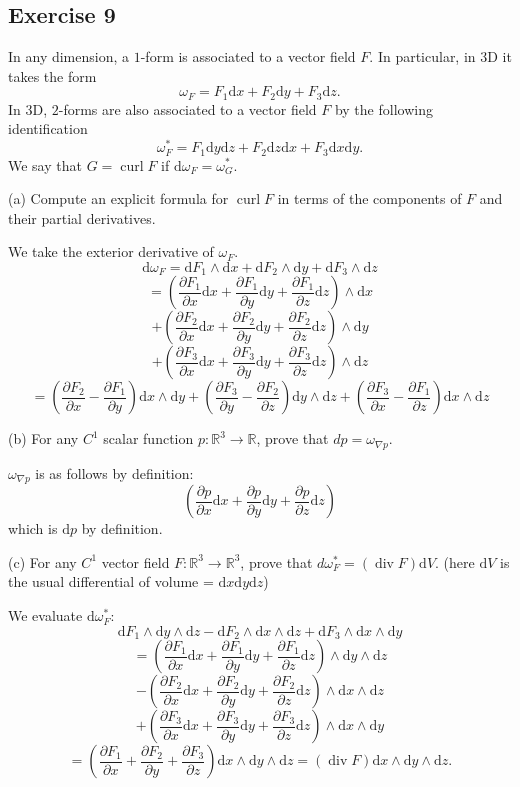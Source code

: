 \documentclass{amsart}
\newcommand{\R}{\mathbb R}
\newcommand{\dd}{\mathrm d}
\DeclareMathOperator{\curl}{curl}
\DeclareMathOperator{\dv}{div}
\begin{document}
\bigskip

\subsection*{Exercise 9} In any dimension, a $1$-form is associated to a vector field $F$. In particular, in 3D it takes the form
\[ \omega_F = F_1 \dd x + F_2 \dd y + F_3 \dd z.\]
In 3D, $2$-forms are also associated to a vector field $F$ by the following identification
\[ \omega^\ast_F = F_1 \dd y \dd z + F_2 \dd z \dd x + F_3 \dd x \dd y.\]
We say that $G = \curl F$ if $\mathrm d \omega_F = \omega^\ast_G$.

(a) Compute an explicit formula for $\curl F$ in terms of the components of $F$ and their partial derivatives.

\medskip \noindent We take the exterior derivative of $\omega_F$. 
\[\dd\omega_F=\dd F_1\wedge\dd x+\dd F_2\wedge\dd y+\dd F_3\wedge\dd z\]
\[=\left(\frac{\partial F_1}{\partial x}\dd x+\frac{\partial F_1}{\partial y}\dd y+\frac{\partial F_1}{\partial z}\dd z\right)\wedge\dd x\]
\[+\left(\frac{\partial F_2}{\partial x}\dd x+\frac{\partial F_2}{\partial y}\dd y+\frac{\partial F_2}{\partial z}\dd z\right)\wedge\dd y\]
\[+\left(\frac{\partial F_3}{\partial x}\dd x+\frac{\partial F_3}{\partial y}\dd y+\frac{\partial F_3}{\partial z}\dd z\right)\wedge\dd z\]
\[=\left(\frac{\partial F_2}{\partial x}-\frac{\partial F_1}{\partial y}\right)\dd x\wedge\dd y+\left(\frac{\partial F_3}{\partial y}-\frac{\partial F_2}{\partial z}\right)\dd y\wedge\dd z+\left(\frac{\partial F_3}{\partial x}-\frac{\partial F_1}{\partial z}\right)\dd x\wedge\dd z\]


\bigskip

(b) For any $C^1$ scalar function $p : \R^3 \to \R$, prove that $dp = \omega_{\nabla p}$.

\medskip \noindent $\omega_{\nabla p}$ is as follows by definition: 
\[\left(\frac{\partial p}{\partial x}\dd x+\frac{\partial p}{\partial y}\dd y+\frac{\partial p}{\partial z}\dd z\right)\] which is $\dd p$ by definition.

(c) For any $C^1$ vector field $F : \R^3 \to \R^3$, prove that $d\omega^\ast_F = (\dv F) \dd V$. (here $\dd V$ is the usual differential of volume = $\dd x \dd y \dd z$)

\medskip \noindent We evaluate $\dd \omega^*_F$:
\[\dd F_1\wedge\dd y\wedge\dd z-\dd F_2\wedge\dd x\wedge\dd z+\dd F_3\wedge\dd x\wedge\dd y\]
\[=\left(\frac{\partial F_1}{\partial x}\dd x+\frac{\partial F_1}{\partial y}\dd y+\frac{\partial F_1}{\partial z}\dd z\right)\wedge\dd y\wedge\dd z\]
\[-\left(\frac{\partial F_2}{\partial x}\dd x+\frac{\partial F_2}{\partial y}\dd y+\frac{\partial F_2}{\partial z}\dd z\right)\wedge\dd x\wedge\dd z\]
\[+\left(\frac{\partial F_3}{\partial x}\dd x+\frac{\partial F_3}{\partial y}\dd y+\frac{\partial F_3}{\partial z}\dd z\right)\wedge\dd x\wedge\dd y\]
\[=\left(\frac{\partial F_1}{\partial x}+\frac{\partial F_2}{\partial y}+\frac{\partial F_3}{\partial z}\right)\dd x\wedge\dd y\wedge\dd z=(\dv F)\dd x\wedge\dd y\wedge\dd z.\]
\end{document}
